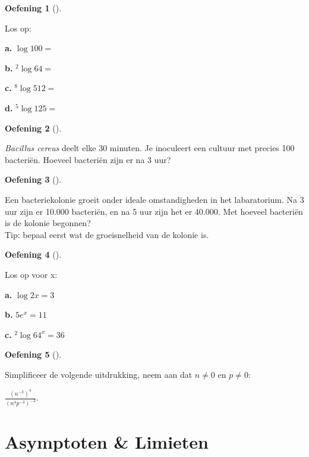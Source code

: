 \documentclass[
  a4paper,
]{scrbook}
\theoremstyle{definition}
\newtheorem{exercise}{Oefening}[chapter]
\theoremstyle{remark}
\begin{document}
\begin{exercise}[]\protect\hypertarget{exr-exp-2}{}\label{exr-exp-2}

Los op:

\textbf{a.} \(\log{100} =\)

\textbf{b.} \(^2\log{64} =\)

\textbf{c.} \(^8\log{512} =\)

\textbf{d.} \(^5\log{125} =\)

\end{exercise}

\begin{exercise}[]\protect\hypertarget{exr-exp-3}{}\label{exr-exp-3}

\emph{Bacillus cereus} deelt elke 30 minuten. Je inoculeert een cultuur
met precies 100 bacteriën. Hoeveel bacteriën zijn er na 3 uur?

\end{exercise}

\begin{exercise}[]\protect\hypertarget{exr-exp-4}{}\label{exr-exp-4}

Een bacteriekolonie groeit onder ideale omstandigheden in het
labaratorium. Na 3 uur zijn er 10.000 bacteriën, en na 5 uur zijn het er
40.000. Met hoeveel bacteriën is de kolonie begonnen?\\
Tip: bepaal eerst wat de groeisnelheid van de kolonie is.

\end{exercise}

\begin{exercise}[]\protect\hypertarget{exr-exp-5}{}\label{exr-exp-5}

Los op voor x:

\textbf{a.} \(\log{2x} = 3\)

\textbf{b.} \(5e^x=11\)

\textbf{c.} \(^2\log{64^x}=36\)

\end{exercise}

\begin{exercise}[]\protect\hypertarget{exr-exp-6}{}\label{exr-exp-6}

Simplificeer de volgende uitdrukking, neem aan dat \(n\neq0\) en
\(p\neq0\):

\(\frac{(n^{-3})^4}{(n^{4}p^{-3})^{-3}}\).

\end{exercise}

\chapter{Asymptoten \& Limieten}\label{sec-limieten}
\end{document}
